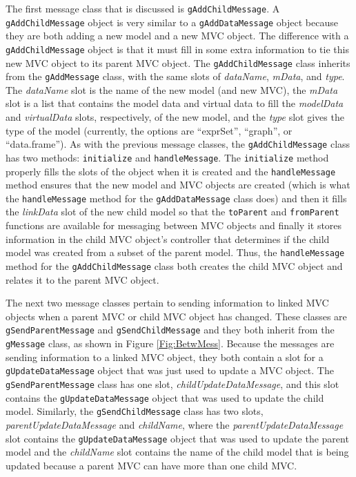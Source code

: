 \documentclass{article}[11pt]
\newcommand{\Rfunction}[1]{{\texttt{#1}}}
\newcommand{\Robject}[1]{{\texttt{#1}}}
\newcommand{\Rslot}[1]{\textsl{#1}}
\begin{document}
The first message class that is discussed is \Robject{gAddChildMessage}.
A \Robject{gAddChildMessage} object is very similar to a
\Robject{gAddDataMessage} object because they are both adding a new
model and a new MVC object.  The difference with a \Robject{gAddChildMessage}
object is that it must fill in some extra information to tie this new MVC
object to its parent MVC object.  The \Robject{gAddChildMessage} class
inherits from the \Robject{gAddMessage} class, with the same slots of
\Rslot{dataName}, \Rslot{mData}, and \Rslot{type}.  The \Rslot{dataName} slot
is the name of the new model (and new MVC), the \Rslot{mData} slot is a list
that contains the model data and virtual data to fill the \Rslot{modelData}
and \Rslot{virtualData} slots, respectively, of the new model, and the
\Rslot{type} slot gives the type of the model (currently, the options are
``exprSet'', ``graph'', or ``data.frame'').  As with the previous message
classes, the \Robject{gAddChildMessage} class has two methods:
\Rfunction{initialize} and \Rfunction{handleMessage}.  The
\Rfunction{initialize} method properly fills the slots of the object when it
is created and the \Rfunction{handleMessage} method ensures that the new model
and MVC objects are created (which is what the \Rfunction{handleMessage}
method for the \Robject{gAddDataMessage} class does) and then it fills the
\Rslot{linkData} slot of the new child model so that the \Rfunction{toParent}
and \Rfunction{fromParent} functions are available for messaging between MVC
objects and finally it stores information in the child MVC object's controller
that determines if the child model was created from a subset of the parent
model.  Thus, the \Rfunction{handleMessage} method for the
\Robject{gAddChildMessage} class both creates the child MVC object and relates
it to the parent MVC object. 

The next two message classes pertain to sending information to linked MVC
objects when a parent MVC or child MVC object has changed.  These classes are
\Robject{gSendParentMessage} and \Robject{gSendChildMessage} and they both
inherit from the \Robject{gMessage} class, as shown in Figure
\ref{Fig:BetwMess}.  Because the messages are sending information to a linked
MVC object, they both contain a slot for a \Robject{gUpdateDataMessage} object
that was just used to update a MVC object.  The \Robject{gSendParentMessage}
class has one slot, \Rslot{childUpdateDataMessage}, and this slot contains the
\Robject{gUpdateDataMessage} object that was used to update the child model.
Similarly, the \Robject{gSendChildMessage} class has two slots,
\Rslot{parentUpdateDataMessage} and \Rslot{childName}, where the
\Rslot{parentUpdateDataMessage} slot contains the \Robject{gUpdateDataMessage}
object that was used to update the parent model and the \Rslot{childName} slot
contains the name of the child model that is being updated because a parent
MVC can have more than one child MVC.  
\end{document}
